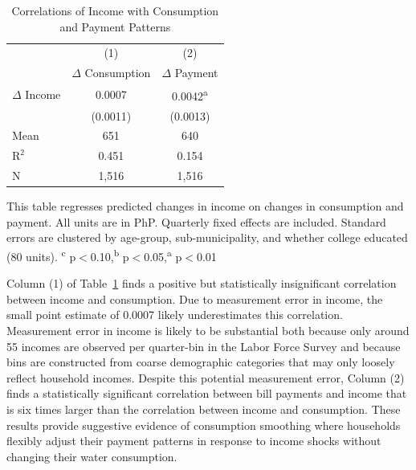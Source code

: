 \documentclass[12pt]{article}
\begin{document}
\begin{table}[!ht]
\small
\centering
\begin{threeparttable}
\caption{Correlations of Income with Consumption and Payment Patterns}\label{table:lfsanalysis}
\vspace{-2mm}
\begin{tabular}{lcc}
\toprule
 & \small (1) & \small (2)  \\
 & \small $\Delta$ Consumption & \small $\Delta$ Payment \\[.5em]
 \toprule
 $\Delta$ Income    &      0.0007                   &      0.0042\textsuperscript{a}\\
                    &    (0.0011)                   &    (0.0013)                   \\[0.2em]
Mean                &         651                   &         640                   \\
$\text{R}^{2}$      &       0.451                   &       0.154                   \\
N                   &       1,516                   &       1,516                   \\
\bottomrule
\end{tabular}
\begin{tablenotes}
\footnotesize
\item 
This table regresses predicted changes in income on changes in consumption and payment.  All units are in PhP.  Quarterly fixed effects are included.  Standard errors are clustered by age-group, sub-municipality, and whether college educated (80 units).  \textsuperscript{c} p$<$0.10,\textsuperscript{b} p$<$0.05,\textsuperscript{a} p$<$0.01 
\end{tablenotes}
\end{threeparttable}
\end{table}

Column (1) of Table~\ref{table:lfsanalysis} finds a positive but statistically insignificant correlation between income and consumption.  Due to measurement error in income, the small point estimate of 0.0007 likely underestimates this correlation.  Measurement error in income is likely to be substantial both because only around 55 incomes are observed per quarter-bin in the Labor Force Survey and because bins are constructed from coarse demographic categories that may only loosely reflect household incomes.  Despite this potential measurement error, Column (2) finds a statistically significant correlation between bill payments and income that is six times larger than the correlation between income and consumption.  These results provide suggestive evidence of consumption smoothing where households flexibly adjust their payment patterns in response to income shocks without changing their water consumption.  
\end{document}

